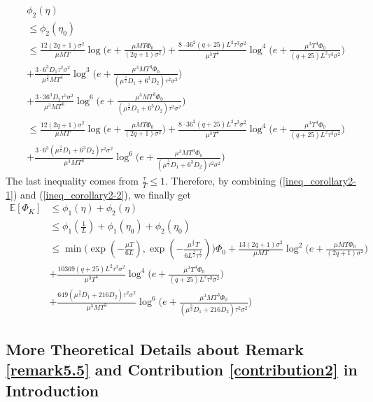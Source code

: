 \documentclass[11pt]{article}
\begin{document}
\begin{align} \label{ineq_corollary2-2}
    &\phi_2(\eta) \nonumber\\
    &\leq \phi_2(\eta_0) \nonumber\\
    &\leq \frac{12(2q+1)\sigma^2}{\mu MT}\log\Big(e+\frac{\mu M T \Phi_0}{(2q+1)\sigma^2}\Big) + \frac{8\cdot36^2(q+25)L^2\tau^3\sigma^2}{\mu^3 T^4}\log^4 \Big(e+ \frac{\mu^3 T^4\Phi_0}{(q+25)L^2\tau^3\sigma^2}\Big)\nonumber\\
    &+ \frac{3\cdot6^3 D_1 \tau^2\sigma^2}{\mu^{\frac{3}{2}}MT^3}\log^3\Big(e+\frac{\mu^3 M T^3\Phi_0}{(\mu^{\frac{3}{2}}D_1+6^3 D_2)\tau^2\sigma^2}\Big) \nonumber\\
    &+ \frac{3\cdot36^3 D_2\tau^5\sigma^2}{\mu^3 MT^6} \log^6\Big(e+ \frac{\mu^3 M T^3\Phi_0}{(\mu^{\frac{3}{2}}D_1+6^3 D_2)\tau^2\sigma^2}\Big) \nonumber\\
    &\leq \frac{12(2q+1)\sigma^2}{\mu MT}\log\Big(e+\frac{\mu M T \Phi_0}{(2q+1)\sigma^2}\Big) + \frac{8\cdot36^2(q+25)L^2\tau^3\sigma^2}{\mu^3 T^4}\log^4 \Big(e+ \frac{\mu^3 T^4\Phi_0}{(q+25)L^2\tau^3\sigma^2}\Big) \nonumber\\
    &+ \frac{3\cdot6^3 (\mu^{\frac{3}{2}}D_1+6^3 D_2)\tau^2\sigma^2}{\mu^3 M T^3} \log^6 \Big(e + \frac{\mu^3 M T^3\Phi_0}{(\mu^{\frac{3}{2}}D_1+6^3  D_2)\tau^2\sigma^2}\Big)
\end{align}
The last inequality comes from $\frac{\tau}{T} \leq 1$. Therefore, by combining (\ref{ineq_corollary2-1}) and (\ref{ineq_corollary2-2}), we finally get
\begin{align*}
    \mathbb{E}[\Phi_K] &\leq \phi_1(\eta) + \phi_2(\eta) \\
    &\leq \phi_1(\frac{1}{L}) + \phi_1(\eta_0) + \phi_2(\eta_0) \\
    &\leq \min \Big( \exp(-\frac{\mu T}{6L}), \exp(-\frac{\mu^{\frac{1}{2}}T}{6 L^{\frac{1}{2}}\tau^{\frac{1}{2}}})\Big) \Phi_0 + \frac{13(2q+1)\sigma^2}{\mu MT} \log^2 \Big(e+\frac{\mu M T \Phi_0}{(2q+1)\sigma^2}\Big) \\
        &+ \frac{10369(q+25)L^2\tau^3\sigma^2}{\mu^3 T^4}\log^4 \Big(e+ \frac{\mu^3 T^4\Phi_0}{(q+25)L^2\tau^3\sigma^2}\Big) \\
        &+ \frac{649(\mu^{\frac{3}{2}}D_1+216D_2)\tau^2\sigma^2}{\mu^3 M T^3} \log^6 \Big(e + \frac{\mu^3 M T^3\Phi_0}{(\mu^{\frac{3}{2}}D_1+216 D_2)\tau^2\sigma^2}\Big)
\end{align*}

\subsection{More Theoretical Details about Remark \ref{remark5.5} and Contribution \ref{contribution2} in Introduction}%
\label{app:fedcomgate}
\end{document}
